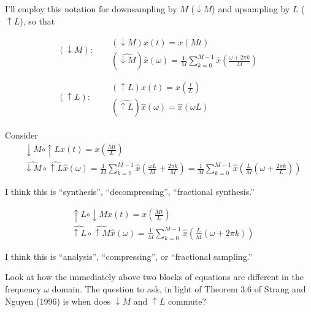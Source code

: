 \documentclass[twoside]{amsart}
\theoremstyle{plain}
\theoremstyle{definition}
\theoremstyle{remark}
\numberwithin{equation}{section}
\begin{document}
I'll employ this notation for downsampling by $M$ ($\downarrow M$) and upsampling by $L$ ($\uparrow L$), so that 
\begin{equation}\label{Eq:upsamplingdownsampling}
\boxed{ \begin{aligned}
  (\downarrow M) : & \begin{aligned} & \quad \\ & \quad \\  
    & (\downarrow M) x(t) = x(Mt) \\ 
    & (\widehat{ \downarrow M } )\widehat{x}(\omega) = \frac{1}{M} \sum_{k=0}^{M-1} \widehat{x} \left( \frac{ \omega + 2\pi k }{M} \right) \end{aligned} \\
  (\uparrow L) : & \begin{aligned} & \quad \\ 
    & (\uparrow L) x(t) = x\left( \frac{t}{L} \right) \\ 
    & (\widehat{\uparrow L}) \widehat{x}(\omega) = \widehat{x}(\omega L ) \end{aligned}
\end{aligned} }
\end{equation}

Consider 
\[
\begin{aligned}
 & \downarrow M \circ \uparrow L x(t) = x\left( \frac{Mt}{L} \right) \\ 
& \widehat{\downarrow M} \circ \widehat{ \uparrow L}\widehat{x}(\omega) = \frac{1}{M} \sum_{k=0}^{M-1} \widehat{x}\left( \frac{ \omega L}{M} + \frac{2\pi k }{M} \right) = \frac{1}{M} \sum_{k=0}^{M-1} \widehat{x}\left( \frac{L}{M} ( \omega + \frac{2\pi k }{L} ) \right)
\end{aligned}
\]

I think this is ``synthesis'', ``decompressing'', ``fractional synthesis.'' 

\[
\begin{aligned}
  & \uparrow L \circ \downarrow M x(t) = x\left( \frac{Mt}{L} \right) \\ 
  & \widehat{ \uparrow L } \circ \widehat{ \uparrow M } \widehat{x}(\omega ) = \frac{1}{M} \sum_{k=0}^{M-1} \widehat{x}\left( \frac{L}{M} (\omega + 2\pi k) \right)
\end{aligned}
\]

I think this is ``analysis'', ``compressing'', or ``fractional sampling.''

Look at how the immediately above two blocks of equations are different in the frequency $\omega$ domain.  The question to ask, in light of Theorem 3.6 of Strang and Nguyen (1996) \cite{GStrangTNguyen1996} is when does $\downarrow M$ and $\uparrow L$ commute?  
\end{document}
